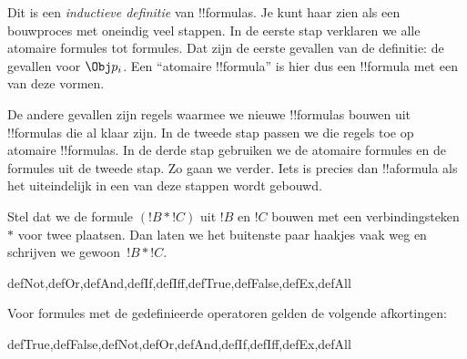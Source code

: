 \documentclass[openany]{memoir}
\begin{document}
\begin{explain}
Dit is een \emph{inductieve definitie} van !!{formula}s. Je kunt haar
zien als een bouwproces met oneindig veel stappen. In de eerste stap
verklaren we alle atomaire formules tot formules. Dat zijn de eerste
gevallen van de definitie: de gevallen voor
%
%
$\Obj p_i$. Een ``atomaire !!{formula}'' is hier dus een !!{formula}
met een van deze vormen.

De andere gevallen zijn regels waarmee we nieuwe !!{formula}s bouwen
uit !!{formula}s die al klaar zijn. In de tweede stap passen we die
regels toe op atomaire !!{formula}s. In de derde stap gebruiken we de
atomaire formules en de formules uit de tweede stap. Zo gaan we verder.
Iets is precies dan !!a{formula} als het uiteindelijk in een van deze
stappen wordt gebouwd.
\end{explain}

Stel dat we de formule $(!B \ast !C)$ uit $!B$ en $!C$ bouwen met een
verbindingsteken~$\ast$ voor twee plaatsen. Dan laten we het buitenste
paar haakjes vaak weg en schrijven we gewoon~$!B \ast !C$.

\begin{tagblock}{defNot,defOr,defAnd,defIf,defIff,defTrue,defFalse,defEx,defAll}
\begin{defn}
Voor formules met de gedefinieerde operatoren gelden de volgende
afkortingen:

\begin{tagenumerate}{defTrue,defFalse,defNot,defOr,defAnd,defIf,defIff,defEx,defAll}







\end{tagenumerate}
\end{defn}
\end{tagblock}
\end{document}
